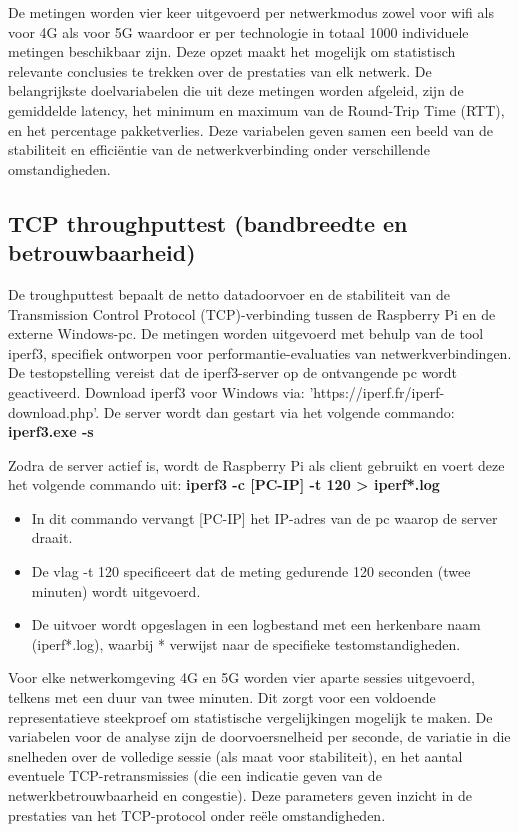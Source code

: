 De metingen worden vier keer uitgevoerd per netwerkmodus zowel voor wifi als voor 4G als voor 5G waardoor er per technologie in totaal 1000 individuele metingen beschikbaar zijn. Deze opzet maakt het mogelijk om statistisch relevante conclusies te trekken over de prestaties van elk netwerk.
De belangrijkste doelvariabelen die uit deze metingen worden afgeleid, zijn de gemiddelde latency, het minimum en maximum van de Round-Trip Time (RTT), en het percentage pakketverlies. Deze variabelen geven samen een beeld van de stabiliteit en efficiëntie van de netwerkverbinding onder verschillende omstandigheden.


\subsection{TCP throughputtest (bandbreedte en betrouwbaarheid)}
De troughputtest bepaalt de netto datadoorvoer en de stabiliteit van de Transmission Control Protocol (TCP)-verbinding tussen de Raspberry Pi en de externe Windows-pc. De metingen worden uitgevoerd met behulp van de tool iperf3, specifiek ontworpen voor performantie-evaluaties van netwerkverbindingen. 
De testopstelling vereist dat de iperf3-server op de ontvangende pc wordt geactiveerd. Download iperf3 voor Windows via: ’https://iperf.fr/iperf-download.php’.
De server wordt dan gestart via het volgende commando: \textbf{iperf3.exe -s} 

Zodra de server actief is, wordt de Raspberry Pi als client gebruikt en voert deze het volgende commando uit: \textbf{iperf3 -c [PC-IP] -t 120 > iperf*.log}

\begin{itemize}
    \item In dit commando vervangt [PC-IP] het IP-adres van de pc waarop de server draait.
    \item De vlag -t 120 specificeert dat de meting gedurende 120 seconden (twee minuten) wordt uitgevoerd. 
    \item De uitvoer wordt opgeslagen in een logbestand met een herkenbare naam (iperf*.log), waarbij * verwijst naar de specifieke testomstandigheden.
\end{itemize}


Voor elke netwerkomgeving 4G en 5G worden vier aparte sessies uitgevoerd, telkens met een duur van twee minuten. Dit zorgt voor een voldoende representatieve steekproef om statistische vergelijkingen mogelijk te maken. 
De variabelen voor de analyse zijn de doorvoersnelheid per seconde, de variatie in die snelheden over de volledige sessie (als maat voor stabiliteit), en het aantal eventuele TCP-retransmissies (die een indicatie geven van de  netwerkbetrouwbaarheid en congestie). Deze parameters geven inzicht in de prestaties van het TCP-protocol onder reële omstandigheden.



